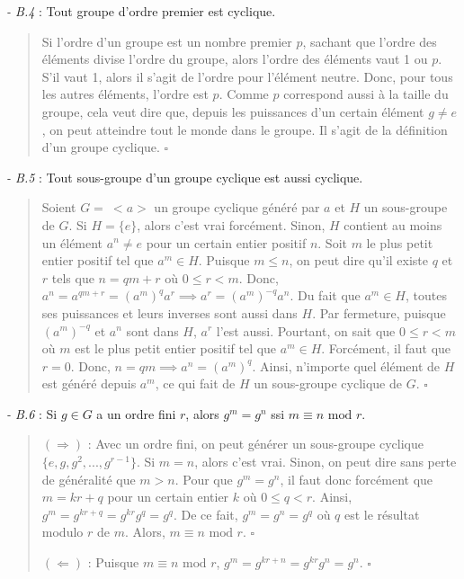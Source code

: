 \textit{- B.4} : Tout groupe d'ordre premier est cyclique.

\begin{quote}
    Si l'ordre d'un groupe est un nombre premier $p$, sachant que l'ordre des éléments divise l'ordre du groupe, alors l'ordre des éléments vaut 1 ou $p$. S'il vaut 1, alors il s'agit de l'ordre pour l'élément neutre. Donc, pour tous les autres éléments, l'ordre est $p$. Comme $p$ correspond aussi à la taille du groupe, cela veut dire que, depuis les puissances d'un certain élément $g \not= e$, on peut atteindre tout le monde dans le groupe. Il s'agit de la définition d'un groupe cyclique. $\square$
\end{quote}

\textit{- B.5} : Tout sous-groupe d'un groupe cyclique est aussi cyclique.

\begin{quote}
    Soient $G =\ < a >$ un groupe cyclique généré par $a$ et $H$ un sous-groupe de $G$. Si $H = \{e\}$, alors c'est vrai forcément. Sinon, $H$ contient au moins un élément $a^n \not= e$ pour un certain entier positif $n$. Soit $m$ le plus petit entier positif tel que $a^m \in H$. Puisque $m \leq n$, on peut dire qu'il existe $q$ et $r$ tels que $n = qm + r$ où $0 \leq r < m$. Donc, $a^n = a^{qm + r} = (a^{m})^q a^r \implies a^r = (a^m)^{-q} a^n$. Du fait que $a^m \in H$, toutes ses puissances et leurs inverses sont aussi dans $H$. Par fermeture, puisque $(a^m)^{-q}$ et $a^n$ sont dans $H$, $a^r$ l'est aussi. Pourtant, on sait que $0 \leq r < m$ où $m$ est le plus petit entier positif tel que $a^m \in H$. Forcément, il faut que $r = 0$. Donc, $n = qm \implies a^n = (a^m)^q$. Ainsi, n'importe quel élément de $H$ est généré depuis $a^m$, ce qui fait de $H$ un sous-groupe cyclique de $G$. $\square$     
\end{quote}

\textit{- B.6} : Si $g \in G$ a un ordre fini $r$, alors $g^m = g^n$ ssi $m \equiv n \text{ mod } r$.

\begin{quote}
    $(\Longrightarrow)$ : Avec un ordre fini, on peut générer un sous-groupe cyclique $\{e, g, g^2, ..., g^{r-1}\}$. Si $m = n$, alors c'est vrai. Sinon, on peut dire sans perte de généralité que $m > n$. Pour que $g^m = g^n$, il faut donc forcément que $m = kr + q$ pour un certain entier $k$ où $0 \leq q < r$. Ainsi, $g^m = g^{kr + q} = g^{kr} g^q = g^q$. De ce fait, $g^m = g^n = g^q$ où $q$ est le résultat modulo $r$ de $m$. Alors, $m \equiv n \text{ mod } r$. $\square$

    $(\Longleftarrow)$ : Puisque $m \equiv n \text{ mod } r$, $g^m = g^{kr + n} = g^{kr}g^n = g^n$. $\square$   

\end{quote}

